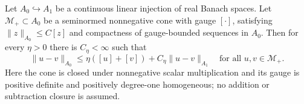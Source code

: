 Let $A_0\hookrightarrow A_1$ be a continuous linear injection of real Banach spaces.
Let $\mathcal M_+\subset A_0$ be a seminormed nonnegative cone with gauge $[\cdot]$, satisfying $\|z\|_{A_0}\le C[z]$ and compactness of gauge-bounded sequences in $A_0$.
Then for every $\eta>0$ there is $C_\eta<\infty$ such that
\[
\|u-v\|_{A_0}\le\eta([u]+[v])+C_\eta\|u-v\|_{A_1}
\quad\text{for all }u,v\in\mathcal M_+.
\]
Here the cone is closed under nonnegative scalar multiplication and its gauge is positive definite and positively degree-one homogeneous; no addition or subtraction closure is assumed.